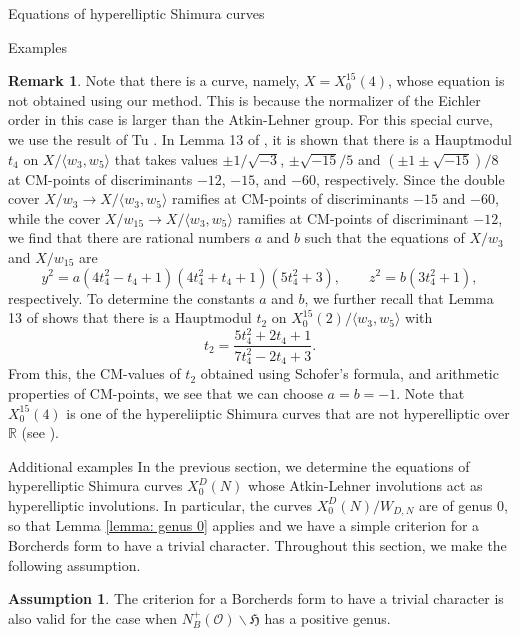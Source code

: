 \documentclass{amsart}
\newcounter{lemma}
\theoremstyle{definition}
\newtheorem{Remark}[lemma]{Remark}
\newtheorem{Assumption}[lemma]{Assumption}
\def\H{\mathfrak H}
\def\O{\mathcal O}
\def\R{\mathbb R}
\def\gen#1{\langle #1\rangle}
\begin{document}
\begin{section}{Equations of hyperelliptic Shimura curves}
\begin{subsection}{Examples}
\begin{Remark} \label{remark: Tu}
Note that there is a curve, namely, $X=X_0^{15}(4)$, whose equation is
not obtained using our method. This is because the normalizer of the
Eichler order in this case is larger than the Atkin-Lehner group.
For this special curve, we use the result of Tu \cite{Tu}. In Lemma 13
of \cite{Tu}, it is shown that there is a Hauptmodul $t_4$ on
$X/\gen{w_3,w_5}$ that takes values $\pm1/\sqrt{-3}$,
$\pm\sqrt{-15}/5$ and $(\pm1\pm\sqrt{-15})/8$ at CM-points of
discriminants $-12$, $-15$, and $-60$, respectively. Since the double
cover $X/w_3\to X/\gen{w_3,w_5}$ ramifies at CM-points of
discriminants $-15$ and $-60$, while the cover $X/w_{15}\to
X/\gen{w_3,w_5}$ ramifies at CM-points of discriminant $-12$, we find
that there are rational numbers $a$ and $b$ such that the equations of
$X/w_3$ and $X/w_{15}$ are
$$
  y^2=a(4t_4^2-t_4+1)(4t_4^2+t_4+1)(5t_4^2+3), \qquad
  z^2=b(3t_4^2+1),
$$
respectively. To determine the constants $a$ and $b$, we further
recall that Lemma 13 of \cite{Tu} shows that there is a Hauptmodul
$t_2$ on $X_0^{15}(2)/\gen{w_3,w_5}$ with
$$
  t_2=\frac{5t_4^2+2t_4+1}{7t_4^2-2t_4+3}.
$$
From this, the CM-values of $t_2$ obtained using Schofer's formula,
and arithmetic properties of CM-points, we see that we can choose
$a=b=-1$. Note that $X_0^{15}(4)$ is one of the hypereliiptic Shimura
curves that are not hyperelliptic over $\R$ (see \cite{Ogg}).
\end{Remark}
\end{subsection}

\begin{subsection}{Additional examples}
\label{subsection: additional}
In the previous section, we determine the equations of hyperelliptic
Shimura curves $X_0^D(N)$ whose Atkin-Lehner involutions act as
hyperelliptic involutions. In particular, the curves
$X_0^D(N)/W_{D,N}$ are of genus $0$, so that Lemma \ref{lemma: genus
  0} applies and we have a simple criterion for a Borcherds form to
have a trivial character. Throughout this section, we make the following
assumption.

\begin{Assumption} \label{assumption: 1}
  The criterion for a Borcherds form to have a trivial character is
  also valid for the case when $N_B^+(\O)\backslash\H$ has a positive genus.
\end{Assumption}


\end{subsection}
\end{section}
\end{document}

